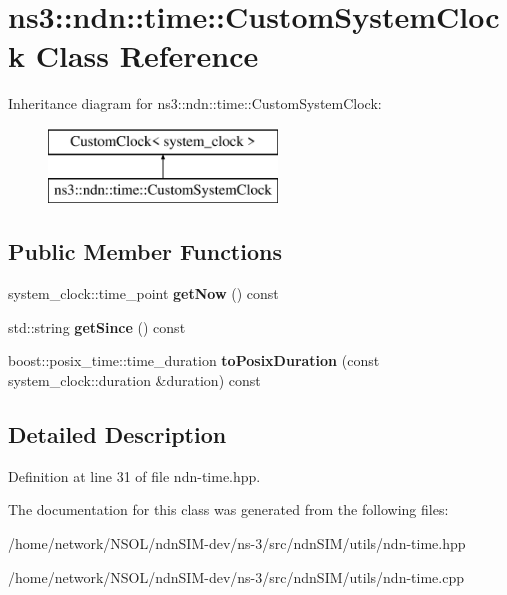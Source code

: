 \hypertarget{classns3_1_1ndn_1_1time_1_1CustomSystemClock}{}\section{ns3\+:\+:ndn\+:\+:time\+:\+:Custom\+System\+Clock Class Reference}
\label{classns3_1_1ndn_1_1time_1_1CustomSystemClock}
Inheritance diagram for ns3\+:\+:ndn\+:\+:time\+:\+:Custom\+System\+Clock\+:\begin{figure}[H]
\begin{center}
\leavevmode
\includegraphics[height=2.000000cm]{classns3_1_1ndn_1_1time_1_1CustomSystemClock}
\end{center}
\end{figure}
\subsection*{Public Member Functions}
\begin{DoxyCompactItemize}
\item 
system\+\_\+clock\+::time\+\_\+point {\bfseries get\+Now} () const\hypertarget{classns3_1_1ndn_1_1time_1_1CustomSystemClock_a6973a2a93b309b3f05560eb113d583a6}{}\label{classns3_1_1ndn_1_1time_1_1CustomSystemClock_a6973a2a93b309b3f05560eb113d583a6}

\item 
std\+::string {\bfseries get\+Since} () const\hypertarget{classns3_1_1ndn_1_1time_1_1CustomSystemClock_a6c3c46d85da04706669e3cc267818fdf}{}\label{classns3_1_1ndn_1_1time_1_1CustomSystemClock_a6c3c46d85da04706669e3cc267818fdf}

\item 
boost\+::posix\+\_\+time\+::time\+\_\+duration {\bfseries to\+Posix\+Duration} (const system\+\_\+clock\+::duration \&duration) const\hypertarget{classns3_1_1ndn_1_1time_1_1CustomSystemClock_a61d825a1271595c39b96e4db32488f55}{}\label{classns3_1_1ndn_1_1time_1_1CustomSystemClock_a61d825a1271595c39b96e4db32488f55}

\end{DoxyCompactItemize}


\subsection{Detailed Description}


Definition at line 31 of file ndn-\/time.\+hpp.



The documentation for this class was generated from the following files\+:\begin{DoxyCompactItemize}
\item 
/home/network/\+N\+S\+O\+L/ndn\+S\+I\+M-\/dev/ns-\/3/src/ndn\+S\+I\+M/utils/ndn-\/time.\+hpp\item 
/home/network/\+N\+S\+O\+L/ndn\+S\+I\+M-\/dev/ns-\/3/src/ndn\+S\+I\+M/utils/ndn-\/time.\+cpp\end{DoxyCompactItemize}
